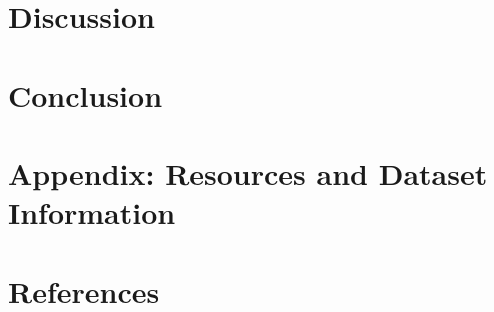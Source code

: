 \documentclass[12pt,a4paper]{report}
\begin{document}
\chapter{Discussion}
\label{chapter_discussion}
\pagestyle{plain}


\chapter{Conclusion}
\label{chapter_conclusion}
\pagestyle{plain}




\chapter{Appendix: Resources and Dataset Information}
\label{chapter_appendix}


\chapter{References}
\label{chapter_references}


\clearpage
\thispagestyle{empty}
\end{document}

